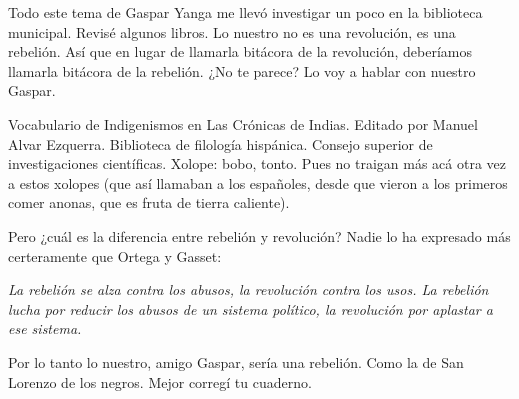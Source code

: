 \documentclass[12pt,twoside,openright,a5paper]{book}
\begin{document}
\afterpage{}
\vspace{0.5cm}
\hrulefill\hspace{0.2cm} \decofourleft\decofourright \hspace{0.2cm} \hrulefill
\vspace{0.5cm}

Todo este tema de Gaspar Yanga me llevó investigar un poco en
la biblioteca municipal. Revisé algunos libros. Lo nuestro no es
una revolución, es una rebelión. Así que en lugar de
llamarla bitácora de la revolución, deberíamos llamarla bitácora de la
rebelión. ¿No te parece? Lo voy a hablar con nuestro Gaspar.


\vspace{0.5cm}
\hrulefill\hspace{0.2cm} \decofourleft\decofourright \hspace{0.2cm} \hrulefill
\vspace{0.5cm}

Vocabulario de Indigenismos en Las Crónicas de Indias. Editado por  Manuel
Alvar Ezquerra. Biblioteca de filología hispánica. Consejo superior de
investigaciones científicas. Xolope: bobo, tonto. Pues no traigan más
acá otra vez a estos xolopes (que así llamaban a los españoles, desde
que vieron a los primeros comer anonas, que es fruta de tierra caliente).


\vspace{0.5cm}
\hrulefill\hspace{0.2cm} \decofourleft\decofourright \hspace{0.2cm} \hrulefill
\vspace{0.5cm}

Pero ¿cuál es la diferencia entre rebelión y revolución? Nadie lo ha
expresado más certeramente que Ortega y Gasset:

\emph{La rebelión se alza contra los abusos, la revolución contra los
usos. La rebelión lucha por reducir los abusos de un sistema político,
la revolución por aplastar a ese sistema.}

Por lo tanto lo nuestro, amigo Gaspar, sería una rebelión. Como la de
San Lorenzo de los negros. Mejor corregí tu cuaderno.



\vspace{0.5cm}
\hrulefill\hspace{0.2cm} \decofourleft\decofourright \hspace{0.2cm} \hrulefill
\vspace{0.5cm}
\end{document}
